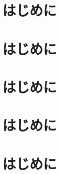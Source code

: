 \documentclass[10pt]{../../sty/jskbook}
\begin{document}
    \maketitle
    \clearpage

    \chapter{はじめに}
    

    \chapter{はじめに}
    

    \chapter{はじめに}
    

    \chapter{はじめに}
    

    \chapter{はじめに}
    


    
    
\end{document}
